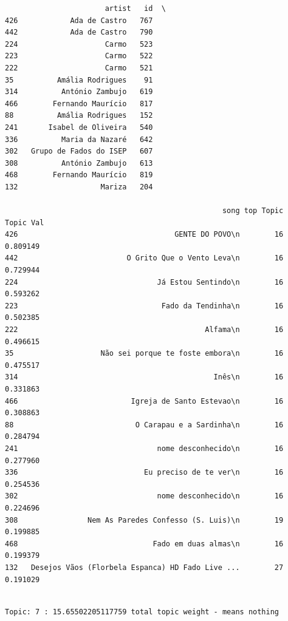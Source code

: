 \documentclass[11pt]{article}
\begin{document}
    
    \begin{verbatim}
                       artist   id  \
426            Ada de Castro   767   
442            Ada de Castro   790   
224                    Carmo   523   
223                    Carmo   522   
222                    Carmo   521   
35          Amália Rodrigues    91   
314          António Zambujo   619   
466        Fernando Maurício   817   
88          Amália Rodrigues   152   
241       Isabel de Oliveira   540   
336          Maria da Nazaré   642   
302   Grupo de Fados do ISEP   607   
308          António Zambujo   613   
468        Fernando Maurício   819   
132                   Mariza   204   

                                                  song top Topic  Topic Val  
426                                    GENTE DO POVO\n        16   0.809149  
442                         O Grito Que o Vento Leva\n        16   0.729944  
224                                Já Estou Sentindo\n        16   0.593262  
223                                 Fado da Tendinha\n        16   0.502385  
222                                           Alfama\n        16   0.496615  
35                    Não sei porque te foste embora\n        16   0.475517  
314                                             Inês\n        16   0.331863  
466                          Igreja de Santo Estevao\n        16   0.308863  
88                            O Carapau e a Sardinha\n        16   0.284794  
241                                nome desconhecido\n        16   0.277960  
336                             Eu preciso de te ver\n        16   0.254536  
302                                nome desconhecido\n        16   0.224696  
308                Nem As Paredes Confesso (S. Luis)\n        19   0.199885  
468                               Fado em duas almas\n        16   0.199379  
132   Desejos Vãos (Florbela Espanca) HD Fado Live ...        27   0.191029  
    \end{verbatim}

    
    \begin{Verbatim}[commandchars=\\\{\}]

Topic: 7 : 15.65502205117759 total topic weight - means nothing

    \end{Verbatim}
\end{document}
